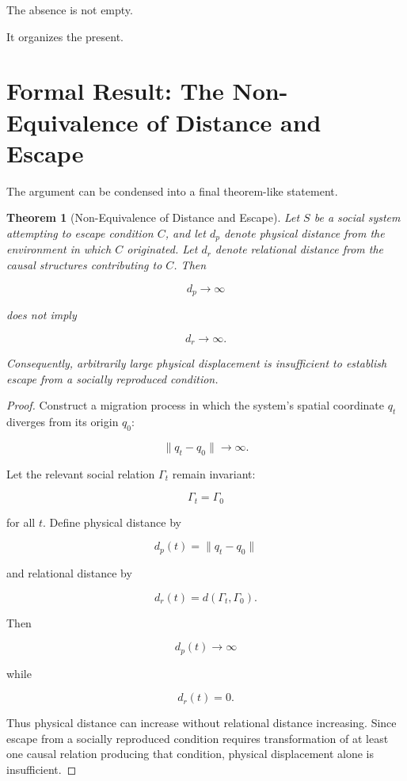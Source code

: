 \documentclass[11pt,oneside]{book}
\newtheorem{theorem}{Theorem}[chapter]
\theoremstyle{definition}
\theoremstyle{remark}
\begin{document}
The absence is not empty.

It organizes the present.

\section{Formal Result: The Non-Equivalence of Distance and Escape}

The argument can be condensed into a final theorem-like statement.

\begin{theorem}[Non-Equivalence of Distance and Escape]
Let \(S\) be a social system attempting to escape condition \(C\), and let \(d_p\) denote physical distance from the environment in which \(C\) originated. Let \(d_r\) denote relational distance from the causal structures contributing to \(C\). Then

\[
d_p\rightarrow\infty
\]

does not imply

\[
d_r\rightarrow\infty.
\]

Consequently, arbitrarily large physical displacement is insufficient to establish escape from a socially reproduced condition.
\end{theorem}

\begin{proof}
Construct a migration process in which the system's spatial coordinate \(q_t\) diverges from its origin \(q_0\):

\[
\|q_t-q_0\|\rightarrow\infty.
\]

Let the relevant social relation \(\Gamma_t\) remain invariant:

\[
\Gamma_t=\Gamma_0
\]

for all \(t\). Define physical distance by

\[
d_p(t)=\|q_t-q_0\|
\]

and relational distance by

\[
d_r(t)=d(\Gamma_t,\Gamma_0).
\]

Then

\[
d_p(t)\rightarrow\infty
\]

while

\[
d_r(t)=0.
\]

Thus physical distance can increase without relational distance increasing. Since escape from a socially reproduced condition requires transformation of at least one causal relation producing that condition, physical displacement alone is insufficient.
\end{proof}
\end{document}

